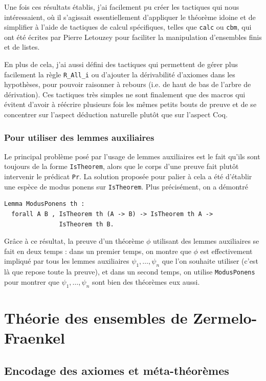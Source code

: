 \documentclass[a4paper]{article}
\theoremstyle{remark}
\theoremstyle{remark}
\theoremstyle{remark}
\theoremstyle{definition}
\theoremstyle{definition}
\theoremstyle{definition}
\begin{document}
Une fois ces résultats établis, j'ai facilement pu créer les tactiques qui nous intéressaient, où il s'agissait essentiellement d'appliquer le théorème idoine et de simplifier à l'aide de tactiques de calcul spécifiques, telles que \verb+calc+ ou \verb+cbm+, qui ont été écrites par Pierre Letouzey pour faciliter la manipulation d'ensembles finis et de listes.
\smallskip

En plus de cela, j'ai aussi défini des tactiques qui permettent de gérer plus facilement la règle \verb+R_All_i+ ou d'ajouter la dérivabilité d'axiomes dans les hypothèses, pour pouvoir raisonner à rebours (i.e. de haut de bas de l'arbre de dérivation). Ces tactiques très simples ne sont finalement que des macros qui évitent d'avoir à réécrire plusieurs fois les mêmes petits bouts de preuve et de se concentrer sur l'aspect déduction naturelle plutôt que sur l'aspect Coq.

\subsubsection{Pour utiliser des lemmes auxiliaires}\label{sol}

Le principal problème posé par l'usage de lemmes auxiliaires est le fait qu'ils sont toujours de la forme \verb+IsTheorem+, alors que le corps d'une preuve fait plutôt intervenir le prédicat \verb+Pr+. La solution proposée pour palier à cela a été d'établir une espèce de modus ponens sur \verb+IsTheorem+. Plus précisément, on a démontré
\begin{verbatim}
Lemma ModusPonens th :
  forall A B , IsTheorem th (A -> B) -> IsTheorem th A ->
               IsTheorem th B.

\end{verbatim}
Grâce à ce résultat, la preuve d'un théorème $\phi$ utilisant des lemmes auxiliaires se fait en deux temps : dans un premier temps, on montre que $\phi$ est effectivement impliqué par tous les lemmes auxiliaires $\psi_1, \ldots, \psi_n$ que l'on souhaite utiliser (c'est là que repose toute la preuve), et dans un second temps, on utilise \verb+ModusPonens+ pour montrer que $\psi_1, \ldots, \psi_n$ sont bien des théorèmes eux aussi.


\section{Théorie des ensembles de {\sc Zermelo-Fraenkel}}

\subsection{Encodage des axiomes et méta-théorèmes}
\end{document}
